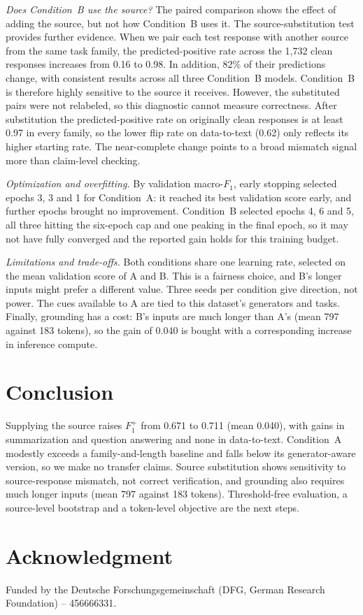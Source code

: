 \documentclass[conference]{IEEEtran}
\begin{document}
\textit{Does Condition~B use the source?} The paired comparison shows the effect of adding the source, but not how
Condition~B uses it. The source-substitution test provides further evidence.
When we pair each test response with another source from the same task family, the
predicted-positive rate across the 1{,}732 clean responses increases from 0.16
to 0.98. In addition, 82\% of their predictions change, with consistent results
across all three Condition~B models. Condition~B is therefore highly sensitive
to the source it receives. However, the substituted pairs were not relabeled,
so this diagnostic cannot measure correctness. After substitution the predicted-positive rate on
originally clean responses is at least 0.97 in every family, so the lower flip
rate on data-to-text (0.62) only reflects its higher starting rate. The
near-complete change points to a broad mismatch signal more than claim-level
checking.

\textit{Optimization and overfitting.} By validation macro-$F_1$, early stopping
selected epochs 3, 3 and 1 for Condition~A: it reached its best validation score
early, and further epochs brought no improvement. Condition~B selected epochs 4,
6 and 5, all three hitting the six-epoch cap and one peaking in the final epoch,
so it may not have fully converged and the reported gain holds for this training
budget.

\textit{Limitations and trade-offs.} Both conditions share one learning rate,
selected on the mean validation score of A and B. This is a fairness choice,
and B's longer inputs might prefer a different value. Three seeds per condition
give direction, not power. The cues available to A are tied to this dataset's
generators and tasks. Finally, grounding has a cost: B's inputs are much longer
than A's (mean 797 against 183 tokens),
so the gain of 0.040 is bought with a corresponding increase in inference
compute.

\section{Conclusion}

Supplying the source raises $F_1^{+}$ from 0.671 to 0.711 (mean 0.040), with
gains in summarization and question answering and none in data-to-text.
Condition~A modestly exceeds a family-and-length baseline and falls below its
generator-aware version, so we make no transfer claims. Source substitution
shows sensitivity to source-response mismatch, not correct verification, and
grounding also requires much longer inputs (mean 797 against 183 tokens).
Threshold-free evaluation, a source-level bootstrap and a token-level objective
are the next steps.

\section*{Acknowledgment}
Funded by the Deutsche Forschungsgemeinschaft (DFG, German Research Foundation) -- 456666331.



\end{document}
